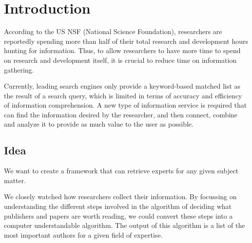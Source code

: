 \chapter{Introduction}

According to the US NSF (National Science Foundation), researchers are reportedly spending more than half of their total research and development hours hunting for information. Thus, to allow researchers to have more time to spend on research and development itself, it is crucial to reduce time on information gathering. 

Currently, leading search engines only provide a keyword-based matched list as the result of a search query, which is limited in terms of accuracy and efficiency of information comprehension. A new type of information service is required that can find the information desired by the researcher, and then connect, combine and analyze it to provide as much value to the user as possible.

\section{Idea}

We want to create a framework that can retrieve experts for any given subject matter.

We closely watched how researchers collect their information. By focussing on understanding the different steps involved in the algorithm of deciding what publishers and papers are worth reading, we could convert these steps into a computer understandable algorithm. The output of this algorithm is a list of the most important authors for a given field of expertise.